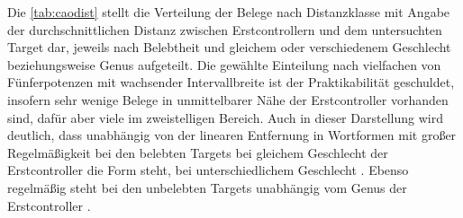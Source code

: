 Die \cref{tab:caodist} stellt die Verteilung der Belege nach Distanzklasse mit
Angabe der durchschnittlichen Distanz zwischen Erstcontrollern und dem
untersuchten Target dar, jeweils nach Belebtheit und gleichem oder
verschiedenem Geschlecht beziehungsweise Genus aufgeteilt. Die gewählte
Einteilung nach vielfachen von Fünferpotenzen mit wachsender Intervallbreite
ist der Praktikabilität geschuldet, insofern sehr wenige Belege in
unmittelbarer Nähe der Erstcontroller vorhanden sind, dafür aber viele im
zweistelligen Bereich. Auch in dieser Darstellung wird deutlich, dass
unabhängig von der linearen Entfernung in Wortformen mit großer Regelmäßigkeit
bei den belebten Targets bei gleichem Geschlecht der Erstcontroller die Form
 steht, bei unterschiedlichem Geschlecht . Ebenso
regelmäßig steht bei den unbelebten Targets unabhängig vom Genus der
Erstcontroller .

